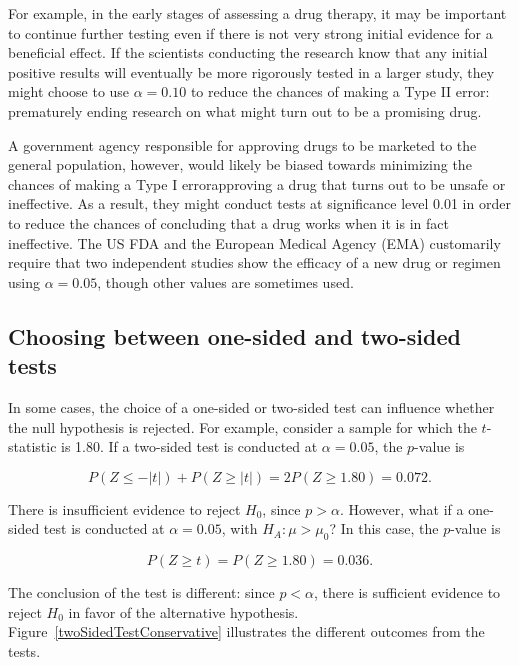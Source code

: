 For example, in the early stages of assessing a drug therapy, it may be important to continue further testing even if there is not very strong initial evidence for a beneficial effect. If the scientists conducting the research know that any initial positive results will eventually be more rigorously tested in a larger study, they might choose to use $\alpha = 0.10$ to reduce the chances of making a Type II error: prematurely ending research on what might turn out to be a promising drug.

A government agency responsible for approving drugs to be marketed to the general population, however, would likely be biased towards minimizing the chances of making a Type I error\textemdash approving a drug that turns out to be unsafe or ineffective. As a result, they might conduct tests at significance level 0.01 in order to reduce the chances of concluding that a drug works when it is in fact ineffective. The US FDA and the European Medical Agency (EMA) customarily require that two independent studies show the efficacy of a new drug or regimen using $\alpha = 0.05$, though other values are sometimes used.


\subsection{Choosing between one-sided and two-sided tests}

In some cases, the choice of a one-sided or two-sided test can influence whether the null hypothesis is rejected. For example, consider a sample for which the $t$-statistic is 1.80. If a two-sided test is conducted at $\alpha = 0.05$, the $p$-value is

\[P(Z \leq -|t|) + P(Z \geq |t|)= 2P(Z \geq 1.80) = 0.072.\]

There is insufficient evidence to reject $H_0$, since $p > \alpha$. However, what if a one-sided test is conducted at $\alpha = 0.05$, with $H_A: \mu > \mu_0$? In this case, the $p$-value is

\[P(Z \geq t)= P(Z \geq 1.80) = 0.036.\]

The conclusion of the test is different: since $p < \alpha$, there is sufficient evidence to reject $H_0$ in favor of the alternative hypothesis. Figure~\ref{twoSidedTestConservative} illustrates the different outcomes from the tests.

